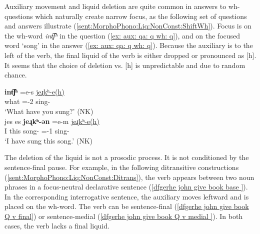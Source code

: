 Auxiliary movement and liquid deletion are quite common in answers to wh-questions which naturally create narrow focus, as the following set of questions and answers illustrate (\ref{sent:MorphoPhono:Liq:NonConst:ShiftWh}). Focus is on the wh-word \textit{{int͡ʃʰ}} in the question (\ref{ex: aux: qa: q wh: q}), and on the focused word `song' in the answer (\ref{ex: aux: qa: q wh: q}). Because the auxiliary is to the left of the verb, the final liquid of the verb is either dropped or pronounced as   [h]. It seems that the choice of deletion vs. [h] is unpredictable and due to random chance.

\begin{exe}
	\ex \label{sent:MorphoPhono:Liq:NonConst:ShiftWh}
	\begin{xlist}
		
		\ex \gll \textbf{int͡ʃʰ} \colorbox{lsLightGray}{=e-s} \uline{jeɻkʰ-e(h)} \\
		what ={\auxgloss}-2{\sg} sing-{\perfcvb}
		\\
		\trans `What have you sung?' \label{ex: aux: qa: q wh: q}\hfill (NK)
		\\
		\ex \gll
		jes {es} \textbf{jeɻkʰ-ən}   \colorbox{lsLightGray}{=e-m} \uline{jeɻkʰ-e(h)}
		\\
		I this song-{} ={\auxgloss}-1{\sg} sing-{\perfcvb}
		\\ 
		\trans `I have sung this song.' \label{ex: aux: qa: q wh: a}\hfill (NK)
		\\
	\end{xlist}
\end{exe}\largerpage



The deletion of the liquid is not a prosodic process. It is not conditioned by the sentence-final pause. For example, in the following ditransitive constructions (\ref{sent:MorphoPhono:Liq:NonConst:Ditrans}), the verb appears between two noun phrases in a focus-neutral declarative sentence (\ref{dfgerhe john give book base }).  In the corresponding interrogative sentence, the auxiliary moves leftward and is  placed on the wh-word. The verb can be sentence-final (\ref{dfgerhe john give book Q v final}) or sentence-medial (\ref{dfgerhe john give book Q v medial }). In both cases, the verb lacks a final liquid.

